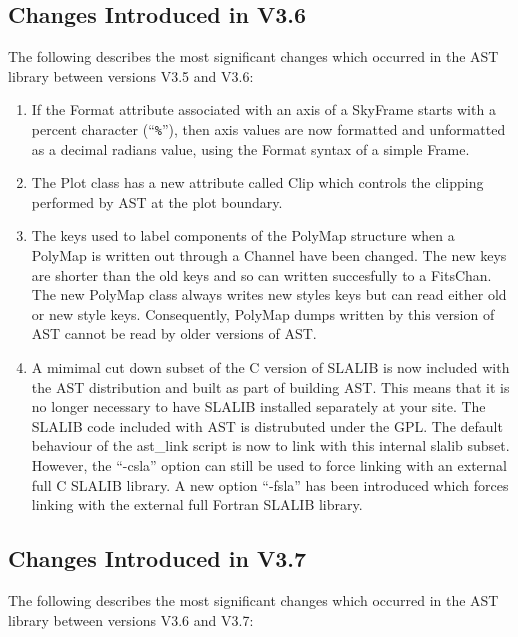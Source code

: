 \documentclass[twoside,11pt]{article}
\begin{document}
\subsection{Changes Introduced in V3.6}

The following describes the most significant changes which 
occurred in the AST library between versions V3.5 and V3.6:

\begin{enumerate}

\item If the Format attribute associated with an axis of a SkyFrame
starts with a percent character (``\verb+%+''), then axis values are
now formatted and unformatted as a decimal radians value, using the
Format syntax of a simple Frame.

\item The Plot class has a new attribute called Clip which controls the
clipping performed by AST at the plot boundary.

\item The keys used to label components of the PolyMap structure when a
PolyMap is written out through a Channel have been changed. The new keys
are shorter than the old keys and so can written succesfully to a FitsChan.
The new PolyMap class always writes new styles keys but can read either
old or new style keys. Consequently, PolyMap dumps written by this
version of AST cannot be read by older versions of AST.

\item A mimimal cut down subset of the C version of SLALIB is now
included with the AST distribution and built as part of building AST.
This means that it is no longer necessary to have SLALIB installed
separately at your site. The SLALIB code included with AST is distrubuted
under the GPL. The default behaviour of the ast\_link script is now to
link with this internal slalib subset. However, the ``-csla'' option can
still be used to force linking with an external full C SLALIB library.
A new option ``-fsla'' has been introduced which forces linking with the
external full Fortran SLALIB library.

\end{enumerate}

\subsection{Changes Introduced in V3.7}

The following describes the most significant changes which
occurred in the AST library between versions V3.6 and V3.7:
\end{document}
